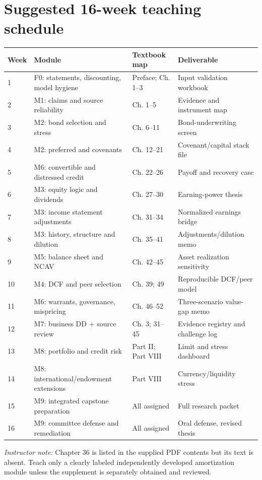 \documentclass[11pt,letterpaper]{article}
\begin{document}
\section{Suggested 16-week teaching schedule}
\begin{center}\small\begin{longtable}{p{}p{}p{}p{}}
\toprule Week & Module & Textbook map & Deliverable \\
\midrule\endhead
1 & F0: statements, discounting, model hygiene & Preface; Ch. 1--3 & Input validation workbook \\
2 & M1: claims and source reliability & Ch. 1--5 & Evidence and instrument map \\
3 & M2: bond selection and stress & Ch. 6--11 & Bond-underwriting screen \\
4 & M2: preferred and covenants & Ch. 12--21 & Covenant/capital stack file \\
5 & M6: convertible and distressed credit & Ch. 22--26 & Payoff and recovery case \\
6 & M3: equity logic and dividends & Ch. 27--30 & Earning-power thesis \\
7 & M3: income statement adjustments & Ch. 31--34 & Normalized earnings bridge \\
8 & M3: history, structure and dilution & Ch. 35--41 & Adjustments/dilution memo \\
9 & M5: balance sheet and NCAV & Ch. 42--45 & Asset realization sensitivity \\
10 & M4: DCF and peer selection & Ch. 39; 49 & Reproducible DCF/peer model \\
11 & M6: warrants, governance, mispricing & Ch. 46--52 & Three-scenario value-gap memo \\
12 & M7: business DD + source review & Ch. 3; 31--45 & Evidence registry and challenge log \\
13 & M8: portfolio and credit risk & Part II; Part VIII & Limit and stress dashboard \\
14 & M8: international/endowment extensions & Part VIII & Currency/liquidity stress \\
15 & M9: integrated capstone preparation & All assigned & Full research packet \\
16 & M9: committee defense and remediation & All assigned & Oral defense, revised thesis \\
\bottomrule\end{longtable}\end{center}
\emph{Instructor note:} Chapter 36 is listed in the supplied PDF contents but its text is absent. Teach only a clearly labeled independently developed amortization module unless the supplement is separately obtained and reviewed.
\end{document}
